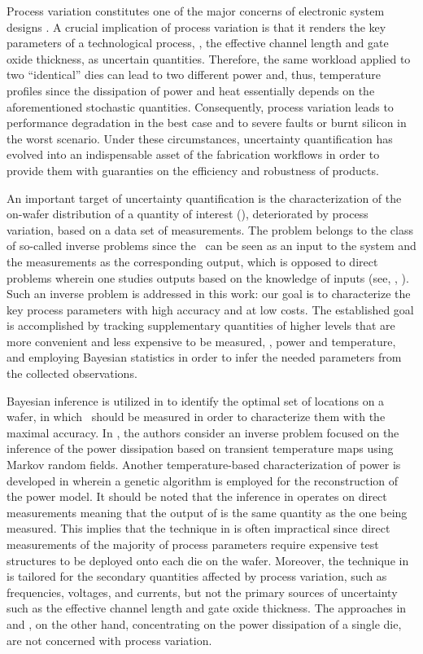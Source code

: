 Process variation constitutes one of the major concerns of electronic system designs \cite{chandrakasan2001, srivastava2010}. A crucial implication of process variation is that it renders the key parameters of a technological process, \eg, the effective channel length and gate oxide thickness, as uncertain quantities.
Therefore, the same workload applied to two ``identical'' dies can lead to two different power and, thus, temperature profiles since the dissipation of power and heat essentially depends on the aforementioned stochastic quantities.
Consequently, process variation leads to performance degradation in the best case and to severe faults or burnt silicon in the worst scenario.
Under these circumstances, uncertainty quantification has evolved into an indispensable asset of the fabrication workflows in order to provide them with guaranties on the efficiency and robustness of products.

An important target of uncertainty quantification is the characterization of the on-wafer distribution of a quantity of interest (\qoi), deteriorated by process variation, based on a data set of measurements.
The problem belongs to the class of so-called inverse problems since the \qoi\ can be seen as an input to the system and the measurements as the corresponding output, which is opposed to direct problems wherein one studies outputs based on the knowledge of inputs (see, \eg, \cite{juan2011, juan2012}).
Such an inverse problem is addressed in this work: our goal is to characterize the key process parameters with high accuracy and at low costs.
The established goal is accomplished by tracking supplementary quantities of higher levels that are more convenient and less expensive to be measured, \eg, power and temperature, and employing Bayesian statistics \cite{gelman2004} in order to infer the needed parameters from the collected observations.

Bayesian inference is utilized in \cite{zhang2010} to identify the optimal set of locations on a wafer, in which \qois\ should be measured in order to characterize them with the maximal accuracy.
In \cite{paek2012}, the authors consider an inverse problem focused on the inference of the power dissipation based on transient temperature maps using Markov random fields.
Another temperature-based characterization of power is developed in \cite{mesa-martinez2007} wherein a genetic algorithm is employed for the reconstruction of the power model.
It should be noted that the inference in \cite{zhang2010} operates on direct measurements meaning that the output of \cite{zhang2010} is the same quantity as the one being measured.
This implies that the technique in \cite{zhang2010} is often impractical since direct measurements of the majority of process parameters require expensive test structures to be deployed onto each die on the wafer.
Moreover, the technique in \cite{zhang2010} is tailored for the secondary quantities affected by process variation, such as frequencies, voltages, and currents, but not the primary sources of uncertainty such as the effective channel length and gate oxide thickness.
The approaches in \cite{paek2012} and \cite{mesa-martinez2007}, on the other hand, concentrating on the power dissipation of a single die, are not concerned with process variation.

